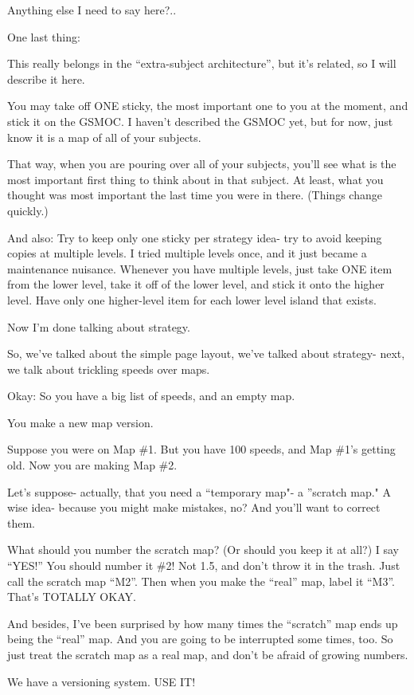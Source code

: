 \documentclass[oneside]{book}
\begin{document}
Anything else I need to say here?..

One last thing:

This really belongs in the ``extra-subject architecture'', but it's
related, so I will describe it here.

You may take off ONE sticky, the most important one to you at the
moment, and stick it on the GSMOC. I haven't described the GSMOC yet,
but for now, just know it is a map of all of your subjects.

That way, when you are pouring over all of your subjects, you'll see
what is the most important first thing to think about in that
subject. At least, what you thought was most important the last time
you were in there. (Things change quickly.)

And also: Try to keep only one sticky per strategy idea- try to avoid
keeping copies at multiple levels. I tried multiple levels once, and
it just became a maintenance nuisance. Whenever you have multiple
levels, just take ONE item from the lower level, take it off of the
lower level, and stick it onto the higher level. Have only one
higher-level item for each lower level island that exists.

Now I'm done talking about strategy.

So, we've talked about the simple page layout, we've talked about
strategy- next, we talk about trickling speeds over maps.

Okay: So you have a big list of speeds, and an empty map.

You make a new map version.

Suppose you were on Map \#1. But you have 100 speeds, and Map \#1's
getting old. Now you are making Map \#2.

Let's suppose- actually, that you need a ``temporary map"- a ''scratch
map." A wise idea- because you might make mistakes, no? And you'll
want to correct them.

What should you number the scratch map? (Or should you keep it at
all?) I say ``YES!'' You should number it \#2! Not 1.5, and don't throw
it in the trash. Just call the scratch map ``M2''. Then when you make
the ``real'' map, label it ``M3''. That's TOTALLY OKAY.

And besides, I've been surprised by how many times the ``scratch'' map
ends up being the ``real'' map. And you are going to be interrupted some
times, too. So just treat the scratch map as a real map, and don't be
afraid of growing numbers.

We have a versioning system. USE IT!
\end{document}
